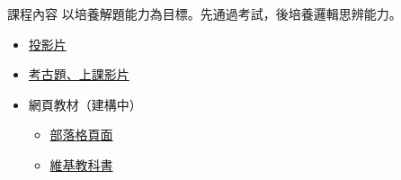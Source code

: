 \documentclass{Slideshow}
\begin{document}
\begin{frame}{課程內容}
    以培養解題能力為目標。先通過考試，後培養邏輯思辨能力。

    \begin{itemize}
        \item \href{https://jdh8.github.io/calculus-slides/}{投影片}
        \item \href{http://jdh8.org/category/calculus-course/}{考古題、上課影片}
        \item 網頁教材（建構中）
            \begin{itemize}
                \item \href{http://jdh8.org/calculus/}{部落格頁面}
                \item \href{https://zh.wikibooks.org/wiki/\%E5\%BE\%AE\%E7\%A7\%AF\%E5\%88\%86\%E5\%AD\%A6}{維基教科書}
            \end{itemize}
    \end{itemize}
\end{frame}

\end{document}
